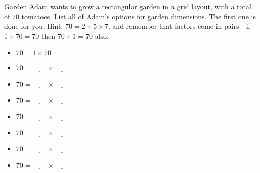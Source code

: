 \documentclass[12pt,letterpaper]{article}
\begin{document}
\begin{problem}{Garden}
 Adam wants to grow a rectangular garden in a grid layout, with a total
 of $70$ tomatoes. List all of Adam's options for garden dimensions.
 The first one is done for you. Hint: $70=2\times5\times7$, and remember
 that factors come in pairs---if $1 \times 70 = 70$ then $70 \times 1 = 70$
 also.

 \begin{itemize}
  \item $70 = 1 \times 70$
  \item $70 = \underline{\hspace{2em}} \times \underline{\hspace{2em}}$
  \item $70 = \underline{\hspace{2em}} \times \underline{\hspace{2em}}$
  \item $70 = \underline{\hspace{2em}} \times \underline{\hspace{2em}}$
  \item $70 = \underline{\hspace{2em}} \times \underline{\hspace{2em}}$
  \item $70 = \underline{\hspace{2em}} \times \underline{\hspace{2em}}$
  \item $70 = \underline{\hspace{2em}} \times \underline{\hspace{2em}}$
  \item $70 = \underline{\hspace{2em}} \times \underline{\hspace{2em}}$
 \end{itemize}

\end{problem}
\end{document}
